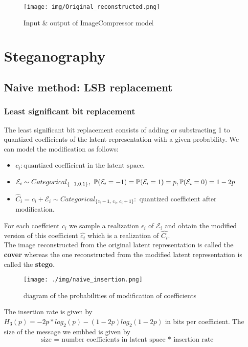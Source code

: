\documentclass[12pt]{article}
\begin{document}
\begin{figure}[H]
    \centering
    \texttt{[image: img/Original\_reconstructed.png]}
    \caption[Image uncompressed \& AI compressed]{Input \& output of ImageCompressor model}
\end{figure}

\section{Steganography}
\subsection{Naive method: LSB replacement}
\subsubsection{Least significant bit replacement}
The least significant bit replacement consists of adding or substracting 1 to quantized coefficients of the latent representation with a given probability. We can model the modification as follows:

\begin{itemize}
    \item $c_i: \text{quantized coefficient in the latent space}$.
    \item $\mathcal{E}
    _i \sim Categorical_{\{-1,0,1\}},\\
    \ \mathbb{P}(\mathcal{E}_i = -1) = \mathbb{P}(\mathcal{E}_i = 1) = p,\\
    \mathbb{P}(\mathcal{E}_i = 0) = 1-2p$ 
    \item $\hat{C}_i = c_i + \mathcal{E}_i \sim Categorical_{\{c_i-1,\ c_i,\ c_i+1\}}:$ quantized coefficient after modification.
\end{itemize}

For each coeffcient $c_i$ we sample a realization $\epsilon_i$ of $\mathcal{E}_i$ and obtain the modified version of this coefficient $\hat{c_i}$ which is a realization of $\hat{C_i}$.\\
The image reconstructed from the original latent representation is called the \textbf{cover} whereas the one reconstructed from the modified latent representation is called the \textbf{stego}.

\begin{figure}[H]
    \centering
    \texttt{[image: ./img/naive\_insertion.png]}
    \caption[Diagram of the probabilities of modification of coefficients]{diagram of the probabilities of modification of coefficients}
    \label{fig:probabilities}
\end{figure}
The insertion rate is given by $H_3(p) = -2p*log_2(p) - (1-2p)log_2(1-2p)$ in bits per coefficient. The size of the message we embbed is given by \[\text{size = number coefficients in latent space * insertion rate}\]
\end{document}
